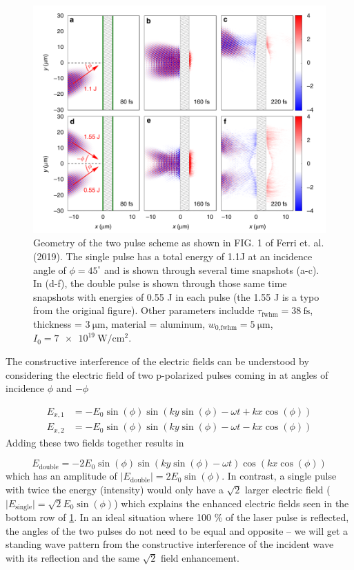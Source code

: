 \begin{figure}
	\centering 
	\includegraphics[width=\linewidth]{planning/images/ferri_dub_pulse.PNG}
	\caption{Geometry of the two pulse scheme as shown in FIG. 1 of Ferri et. al. (2019)\cite{Ferri_2019_Nat_Comm}. The single pulse has a total energy of 1.1J at an incidence angle of $\phi=45^\circ$ and is shown through several time snapshots (a-c). In (d-f), the double pulse is shown through those same time snapshots with energies of 0.55 J in each pulse (the 1.55 J is a typo from the original figure). Other parameters includde $\tau_\text{fwhm} = \SI{38}{\femto \second}$, thickness = $\SI{3}{\micro \meter}$, material = aluminum, $w_\text{0,fwhm} = \SI{5}{\micro \meter}$, $I_0 = \SI{7e19}{\watt \per \centi \meter \squared}$.}
	\label{fig:ferri_dub_pulse}
\end{figure}
The constructive interference of the electric fields can be understood by considering the electric field of two p-polarized pulses coming in at angles of incidence $\phi$ and $-\phi$

\begin{align}
	E_{x,1} &= -E_0 \sin(\phi) \sin(k y \sin(\phi) - \omega t + k x \cos(\phi)) \\
	E_{x,2} &= -E_0 \sin(\phi) \sin(k y \sin(\phi) - \omega t - k x \cos(\phi))
\end{align}
Adding these two fields together results in 

\begin{equation}
	E_\text{double} = -2 E_0 \sin(\phi) \sin(k y \sin(\phi) - \omega t) \cos(k x \cos(\phi))
\end{equation}
which has an amplitude of $\lvert E_\text{double} \rvert = 2 E_0 \sin(\phi)$. In contrast, a single pulse with twice the energy (intensity) would only have a $\sqrt{2}$ larger electric field ($\lvert E_\text{single} \rvert = \sqrt{2} E_0 \sin(\phi)$) which explains the enhanced electric fields seen in the bottom row of \cref{fig:ferri_dub_pulse}. In an ideal situation where 100 \% of the laser pulse is reflected, the angles of the two pulses do not need to be equal and opposite -- we will get a standing wave pattern from the constructive interference of the incident wave with its reflection and the same $\sqrt{2}$ field enhancement.  

